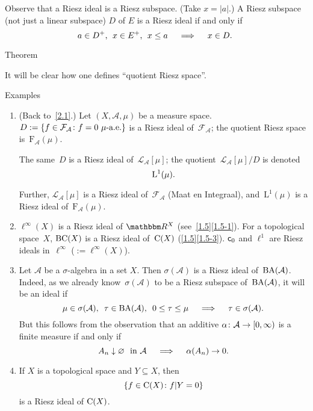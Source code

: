 \documentclass[main.tex]{subfiles}
\begin{document}
Observe that a Riesz ideal is a Riesz subspace. 
(Take $x=|a|$.)
A Riesz subspace (not just a linear subspace) $D$ of $E$
is a Riesz ideal if and only if 
\begin{equation*}
a\in D^+\text{, }\; x\in E^+\text{, }\; x\leq a 
  \quad \implies \quad x\in D\text{. }
\end{equation*}
%
%
\begin{psec}{2.7}{Theorem}

It will be clear
how one defines
``quotient Riesz space''.
\end{psec}
%
%
\begin{psec}{2.8}{Examples}
\begin{enumerate}
\item \label{2.8-1}%
(Back to~\ref{2.1}.)
Let $(X,\mathcal A, \mu)$ be a measure space.
$D:=\{f\in {\mathcal F}_{\mathcal A}\colon f=0\ \mu\text{-a.e.} \}$
is a Riesz ideal of~${\mathcal F}_{\mathcal A}$;
the quotient Riesz space is~$\mathrm{F}_{\mathcal A} (\mu)$.

The same~$D$ is a Riesz ideal of~$\mathcal{L}_{\mathcal A}[\mu]$;
the quotient~${\mathcal L}_{\mathcal A}[\mu]/D$ is denoted
\begin{equation*}
\mathrm{L}^1(\mu)\text{.}
\end{equation*}

Further,
$\mathcal{L}_{\mathcal A}[\mu]$ 
is a Riesz ideal of~${\mathcal F}_{\mathcal A}$
(Maat en Integraal),
and~$\mathrm{L}^1(\mu)$ is a Riesz ideal of~$\mathrm{F}_{\mathcal A}(\mu)$.
%
\item \label{2.8-2}
$\ell^\infty(X)$ is a Riesz ideal of $\R^X$ (see~\ref{1.5}\ref{1.5-1}).
For a topological space~$X$, 
$\mathrm{BC}(X)$ is a Riesz ideal 
of~$\mathrm{C}(X)$ (\ref{1.5}\ref{1.5-3}).
$\mathsf{c}_0$ and $\ell^1$ are Riesz ideals 
in~$\ell^\infty$ ($:=\ell^\infty(X)$).
%
\item \label{2.8-3}
Let $\mathcal A$ be a $\sigma$-algebra in a set $X$.
Then $\sigma(\mathcal A)$ is a Riesz ideal of~$\mathrm{BA}(\mathcal A)$.
Indeed, as we already know~$\sigma(\mathcal A)$ 
to be a Riesz subspace of~$\mathrm{BA}(\mathcal A)$,
it will be an ideal if
\begin{equation*}
\mu\in \sigma(\mathcal A)\htam{, }\ 
\tau\in\BA(\mathcal A)\htam{, }\ 
0\leq \tau\leq \mu
\quad \implies \quad
\tau \in \sigma(\mathcal A)
\htam{.}
\end{equation*}
But this follows from the observation
that an additive $\alpha\colon\mathcal A\rightarrow [0,\infty)$
is a finite measure if and only if
\begin{equation*}
A_n \downarrow \varnothing\ \text{ in }\mathcal A 
\quad \implies \quad
\alpha(A_n)\rightarrow 0
\text{.}
\end{equation*}
%
\item \label{2.8-4}
If $X$ is a topological space and $Y\subseteq X$, then
\begin{equation*}
\{f\in\mathrm{C}(X)\colon f | Y=0 \}
\end{equation*}
is a Riesz ideal of $\mathrm{C}(X)$.


\end{enumerate}
\end{psec}
\end{document}
